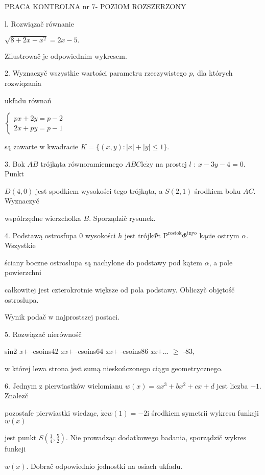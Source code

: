 \documentclass[a4paper,12pt]{article}
\begin{document}
PRACA KONTROLNA nr 7- POZIOM ROZSZERZONY

l. Rozwiązač równanie

$\sqrt{8+2x-x^{2}}=2x-5.$

Zilustrowač je odpowiednim wykresem.

2. Wyznaczyč wszystkie wartości parametru rzeczywistego $p$, dla których rozwiqzania

ukfadu równań

$\left\{\begin{array}{l}
px+2y=p- 2\\
2x+py=p-1
\end{array}\right.$

są zawarte $\mathrm{w}$ kwadracie $K=\{(x,y):|x|+|y|\leq 1\}.$

3. Bok $AB$ trójkąta równoramiennego $ABC\mathrm{l}\mathrm{e}\dot{\mathrm{z}}\mathrm{y}$ na prostej $l$ : $x-3y-4 = 0$. Punkt

$D(4,0)$ jest spodkiem wysokości tego trójkąta, a $S(2,1)$ środkiem boku $AC$. Wyznaczyč

wspólrzędne wierzcholka $B$. Sporządzič rysunek.

4. Podstawą ostrosfupa $0$ wysokości $h$ jest trójk$\Phi$t $\mathrm{P}^{\mathrm{r}\mathrm{o}\mathrm{s}\mathrm{t}\mathrm{o}\mathrm{k}}\Phi^{\mathrm{t}\mathrm{n}\mathrm{y}\mathrm{o}}$ kącie ostrym $\alpha$. Wszystkie

ściany boczne ostrosłupa są nachylone do podstawy pod kątem $\alpha$, a pole powierzchni

całkowitej jest czterokrotnie większe od pola podstawy. Obliczyč objętośč ostroslupa.

Wynik podač $\mathrm{w}$ najprostszej postaci.

5. Rozwiązač nierównośč

sin2 {\it x}$+$ -csoins42 {\it xx}$+$ -csoins64 {\it xx}$+$ -csoins86 {\it xx}$+$... $\geq$ -83,

$\mathrm{w}$ której lewa strona jest sumą nieskończonego ciągu geometrycznego.

6. Jednym $\mathrm{z}$ pierwiastków wielomianu $w(x)=ax^{3}+bx^{2}+cx+d$ jest liczba $-1$. Znalez$\acute{}$č

pozostafe pierwiastki wiedząc, $\dot{\mathrm{z}}\mathrm{e}w(1)=-2\mathrm{i}$ środkiem symetrii wykresu funkcji $w(x)$

jest punkt $S(\displaystyle \frac{1}{4},\frac{5}{2})$. Nie prowadząc dodatkowego badania, sporządzič wykres funkcji

$w(x)$. Dobrač odpowiednio jednostki na osiach ukfadu.
\end{document}
